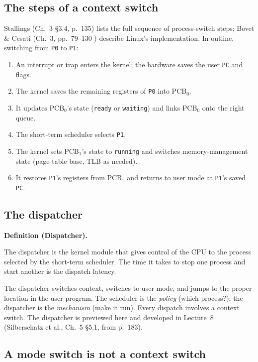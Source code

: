 \documentclass[11pt]{article}
\newenvironment{definitionbox}[1]{%
  \par\noindent\textbf{Definition (#1).}\ \itshape
}{\par\vspace{0.3em}}
\begin{document}
\subsection{The steps of a context switch}

Stallings (Ch.~3 \S3.4, p.~135) lists the full sequence of process-switch steps;
Bovet \& Cesati (Ch.~3, pp.~79--130 \cite{BovetCesati_understanding_linux_kernel})
describe Linux's implementation. In outline, switching from \texttt{P0} to
\texttt{P1}:
\begin{enumerate}
  \item An interrupt or trap enters the kernel; the hardware saves the user
        \texttt{PC} and flags.
  \item The kernel saves the remaining registers of \texttt{P0} into PCB$_0$.
  \item It updates PCB$_0$'s state (\texttt{ready} or \texttt{waiting}) and
        links PCB$_0$ onto the right queue.
  \item The short-term scheduler selects \texttt{P1}.
  \item The kernel sets PCB$_1$'s state to \texttt{running} and switches
        memory-management state (page-table base, TLB as needed).
  \item It restores \texttt{P1}'s registers from PCB$_1$ and returns to user
        mode at \texttt{P1}'s saved \texttt{PC}.
\end{enumerate}

\subsection{The dispatcher}

\begin{definitionbox}{Dispatcher}
The dispatcher is the kernel module that gives control of the CPU to the
process selected by the short-term scheduler. The time it takes to stop one
process and start another is the dispatch latency.
\end{definitionbox}

The dispatcher switches context, switches to user mode, and jumps to the proper
location in the user program. The scheduler is the \emph{policy} (which
process?); the dispatcher is the \emph{mechanism} (make it run). Every dispatch
involves a context switch. The dispatcher is previewed here and developed in
Lecture~8 (Silberschatz et al., Ch.~5 \S5.1, from p.~183).

\subsection{A mode switch is not a context switch}
\end{document}
